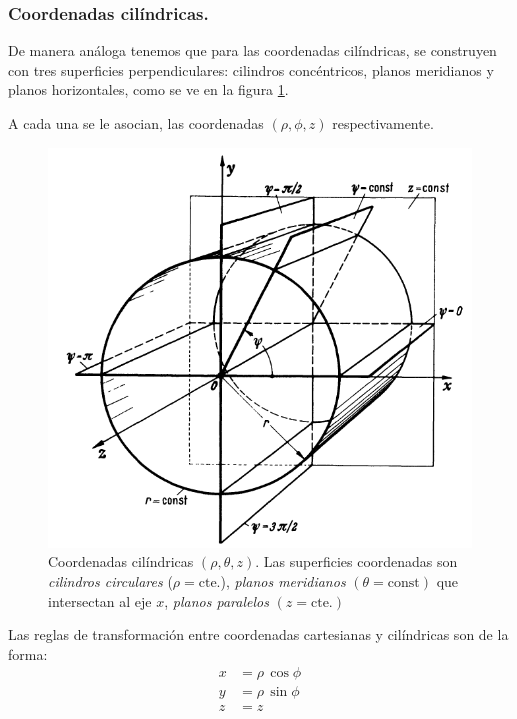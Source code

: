 \subsubsection*{Coordenadas cilíndricas.}

De manera análoga tenemos que para las coordenadas cilíndricas, se construyen con tres superficies perpendiculares: cilindros concéntricos, planos meridianos y planos horizontales, como se ve en la figura \ref{fig:figura_planos_cilindricos}.
\par
A cada una se le asocian, las coordenadas $(\rho, \phi, z)$ respectivamente.
\begin{figure}[H]
   \centering
   \includegraphics[scale=1.5]{Imagenes/Planos_Coordenadas_Cilindricas.png}
   \caption{Coordenadas cilíndricas $(\rho, \theta, z)$. Las superficies coordenadas son \emph{cilindros circulares} ($\rho = \mbox{cte.}$), \emph{planos meridianos} $(\theta = \mbox{const})$ que intersectan al eje $x$, \emph{planos paralelos} $(z = \mbox{cte.})$}
   \label{fig:figura_planos_cilindricos}
\end{figure}
Las reglas de transformación entre coordenadas cartesianas y cilíndricas son de la forma:
\begin{align*}
x &= \rho \, \cos \phi \\ 
y &= \rho \, \sin \phi \\
z &= z
\end{align*}

